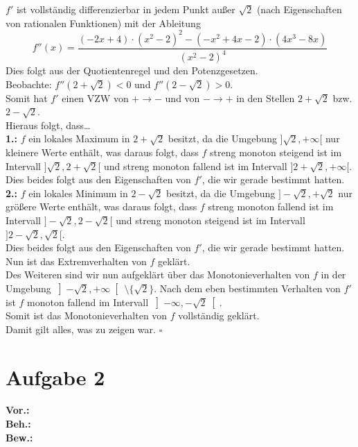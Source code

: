\documentclass[12pt, a4paper]{article}
\newcommand*{\qed}{\null\nobreak\hfill\ensuremath{\square}}
\begin{document}
\(f'\) ist vollständig differenzierbar in jedem Punkt außer \(\sqrt{2}\) (nach Eigenschaften von rationalen Funktionen) mit der Ableitung \[f''(x) = \frac{(-2x+4) \cdot (x^2-2)^2 - (-x^2 + 4x -2) \cdot (4x^3-8x)}{(x^2-2)^4}\]
Dies folgt aus der Quotientenregel und den Potenzgesetzen. \\
Beobachte: \(f''(2 + \sqrt{2}) < 0\) und \(f''(2 - \sqrt{2}) > 0\). \\
Somit hat \(f'\) einen VZW von \(+ \rightarrow -\) und von \(- \rightarrow +\) in den Stellen \(2 + \sqrt{2}\) bzw. \(2 - \sqrt{2}\). \\
Hieraus folgt, dass\dots \\
\textbf{1.:} \(f\) ein lokales Maximum in \(2 + \sqrt{2}\) besitzt, da die Umgebung \(]\sqrt{2}, +\infty[\) nur kleinere Werte enthält, was daraus folgt, dass \(f\) streng monoton steigend ist im Intervall \(]\sqrt{2}, 2+\sqrt{2}[\) und streng monoton fallend ist im Intervall \(]2+\sqrt{2}, +\infty[\). \\
Dies beides folgt aus den Eigenschaften von \(f'\), die wir gerade bestimmt hatten. \pagebreak \\
\textbf{2.:} \(f\) ein lokales Minimum in \(2 - \sqrt{2}\) besitzt, da die Umgebung \(]- \sqrt{2}, + \sqrt{2}\) nur größere Werte enthält, was daraus folgt, dass \(f\) streng monoton fallend ist im Intervall \(] - \sqrt{2}, 2 - \sqrt{2}[\) und streng monoton steigend ist im Intervall \(]2 - \sqrt{2}, \sqrt{2}[\). \\
Dies beides folgt aus den Eigenschaften von \(f'\), die wir gerade bestimmt hatten. \\
Nun ist das Extremverhalten von \(f\) geklärt.\\
Des Weiteren sind wir nun aufgeklärt über das Monotonieverhalten von \(f\) in der Umgebung \(\left]-\sqrt{2}, +\infty\right[\  \setminus \{\sqrt{2}\}\). Nach dem eben bestimmten Verhalten von \(f'\) ist \(f\) monoton fallend im Intervall \(\left]-\infty, -\sqrt{2}\right[\).\\
Somit ist das Monotonieverhalten von \(f\) vollständig geklärt.\\
Damit gilt alles, was zu zeigen war. \qed
\section*{Aufgabe 2}
\textbf{Vor.:} \\
\textbf{Beh.:} \\
\textbf{Bew.:}
\end{document}
